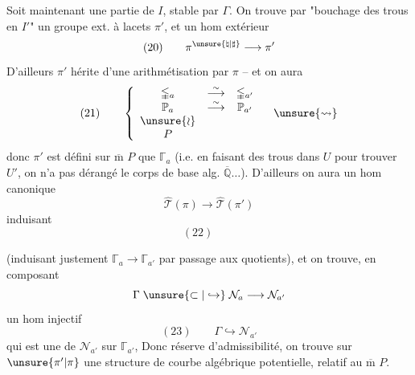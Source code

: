 Soit maintenant
une
partie de $I$, stable par $\Gamma$. On trouve
par "bouchage des trous en $I'$" un
groupe ext. à lacets $\pi'$,  et un
hom extérieur
\[
(20)\qquad \pi^{\unsure{\natural|\sharp}}\longrightarrow\pi'
\]
D'ailleurs $\pi'$ hérite d'une arithmétisation 
par $\pi$ -- et on aura
\[
(21)\qquad
\left\{
\begin{array}{ccc}
\mathbb{\Gamma}_a & \overset{\sim}{\longrightarrow} & \mathbb{\Gamma}_{a'} \\
\mathbb P_a & \overset{\sim}{\longrightarrow} & \mathbb P_{a'} \\
\unsure{\wr} & & \\
P & &
\end{array}
\right.
\quad\unsure{\leadsto}
\]
donc $\pi'$ est défini sur  $\overline{\mathrm m}$ $P$ que
$\mathbb{\Gamma}_a$
(i.e. en faisant des trous dans $U$ pour
trouver $U'$, on n'a pas dérangé le
corps de base alg.  $\overline{\mathbb Q}\ldots$). D'ailleurs
on aura un hom canonique
\[
\widehat{\mathcal T}(\pi)\longrightarrow
\widehat{\mathcal T}(\pi')
\]
induisant
\[
(22)\qquad
\]


(induisant justement $\mathbb{\Gamma}_a\longrightarrow\mathbb{\Gamma}_{a'}$ par passage
aux quotients), et on trouve, en
composant
\[
\Gamma\;\unsure{\subset|\hookrightarrow}\;\mathcal N_a\longrightarrow\mathcal N_{a'}
\]
un hom  injectif
\[
(23)\qquad\Gamma\hookrightarrow\mathcal N_{a'}
\]
qui est une  de $\mathcal N_{a'}$ sur $\mathbb{\Gamma}_{a'}$,
Donc  réserve d'admissibilité,
on trouve sur  $\unsure{\pi'|\pi}$ une structure
de courbe algébrique potentielle, relatif
au $\overline{\mathrm m}$ $P$.

